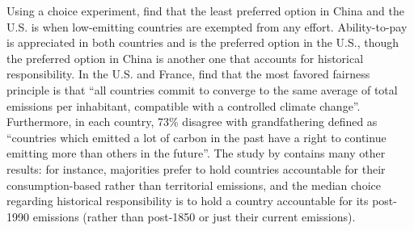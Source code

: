 Using a choice experiment,  find that the least preferred option in China and the U.S. is when low-emitting countries are exempted from any effort. Ability-to-pay is appreciated in both countries and is the preferred option in the U.S., though the preferred option in China is another one that accounts for historical responsibility. %
In the U.S. and France,  find that the most favored fairness principle is that ``all countries commit to converge to the same average of total emissions per inhabitant, compatible with a controlled climate change''. Furthermore, in each country, 73\% disagree with grandfathering defined as ``countries which emitted a lot of carbon in the past have a right to continue emitting more than others in the future''. The study by  contains many other results: for instance, majorities prefer to hold countries accountable for their consumption-based rather than territorial emissions, and the median choice regarding historical responsibility is to hold a country accountable for its post-1990 emissions (rather than post-1850 or just their current emissions). 
